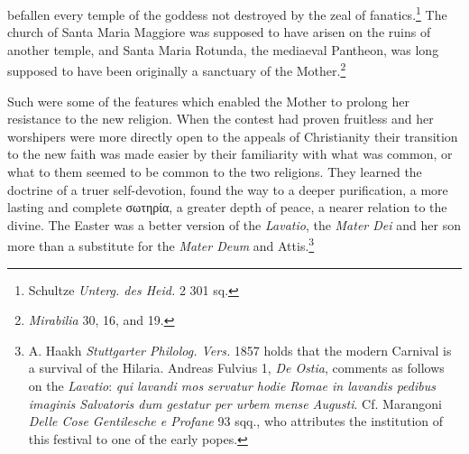 \documentclass[a4paper, 11pt, oneside, polutonikogreek, english]{article}
\begin{document}
befallen every temple of the goddess not destroyed by the zeal of fanatics.\footnote{Schultze \emph{Unterg. des Heid.} 2 301 sq.} The church of Santa Maria Maggiore was supposed to have arisen on the ruins of another temple, and Santa Maria Rotunda, the mediaeval Pantheon, was long supposed to have been originally a sanctuary of the Mother.\footnote{\emph{Mirabilia} 30, 16, and 19.}

Such were some of the features which enabled the Mother to prolong her resistance to the new religion. When the contest had proven fruitless and her worshipers were more directly open to the appeals of Christianity their transition to the new faith was made easier by their familiarity with what was common, or what to them seemed to be common to the two religions. They learned the doctrine of a truer self-devotion, found the way to a deeper purification, a more lasting and complete σωτηρία, a greater depth of peace, a nearer relation to the divine. The Easter was a better version of the \emph{Lavatio}, the \emph{Mater Dei} and her son more than a substitute for the \emph{Mater Deum} and Attis.\footnote{A. Haakh \emph{Stuttgarter Philolog. Vers.} 1857 holds that the modern Carnival is a survival of the Hilaria. Andreas Fulvius 1, \emph{De Ostia}, comments as follows on the \emph{Lavatio}: \emph{qui lavandi mos servatur hodie Romae in lavandis pedibus imaginis Salvatoris dum gestatur per urbem mense Augusti}. Cf. Marangoni \emph{Delle Cose Gentilesche e Profane} 93 sqq., who attributes the institution of this festival to one of the early popes.}
\clearpage
\end{document}
